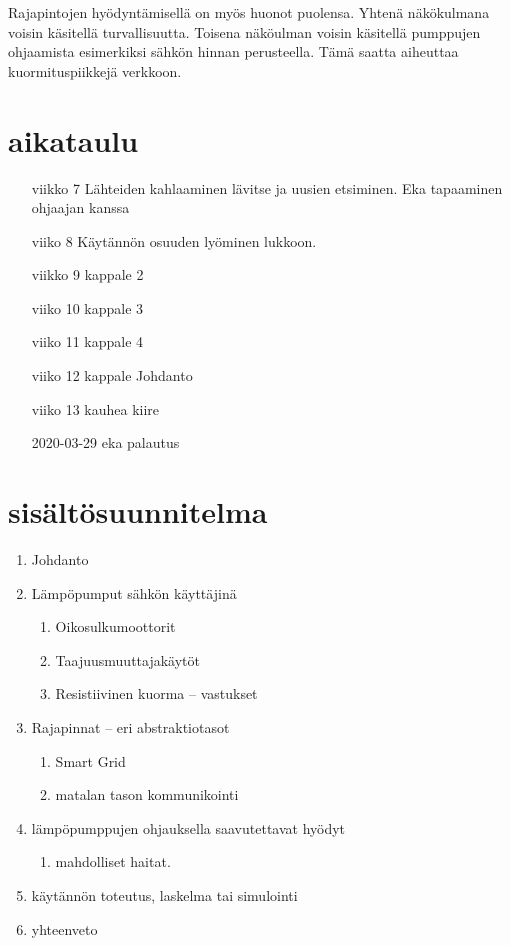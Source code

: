   Rajapintojen hyödyntämisellä on myös huonot puolensa. Yhtenä näkökulmana voisin käsitellä turvallisuutta. Toisena näköulman voisin käsitellä pumppujen ohjaamista esimerkiksi sähkön hinnan perusteella. Tämä saatta aiheuttaa kuormituspiikkejä verkkoon.

\section{aikataulu}
  \begin{itemize}
    \item[viikko 7] Lähteiden kahlaaminen lävitse ja uusien etsiminen. Eka tapaaminen ohjaajan kanssa
    \item[viiko 8] Käytännön osuuden lyöminen lukkoon.
    \item[viikko 9] kappale 2
    \item[viiko 10] kappale 3
    \item[viiko 11] kappale 4
    \item[viiko 12] kappale Johdanto
    \item[viiko 13] kauhea kiire
    \item[2020-03-29] eka palautus
  \end{itemize}


\section{sisältösuunnitelma}

\begin{enumerate}
  \item Johdanto
  \item Lämpöpumput sähkön käyttäjinä
    \begin{enumerate}
      \item Oikosulkumoottorit
      \item Taajuusmuuttajakäytöt
      \item Resistiivinen kuorma -- vastukset
    \end{enumerate}
  \item Rajapinnat -- eri abstraktiotasot
  \begin{enumerate}
    \item Smart Grid
    \item matalan tason kommunikointi
  \end{enumerate}
  \item lämpöpumppujen ohjauksella saavutettavat hyödyt
  \begin{enumerate}
    \item mahdolliset haitat.
  \end{enumerate}
  \item käytännön toteutus, laskelma tai simulointi
  \item yhteenveto
\end{enumerate}



